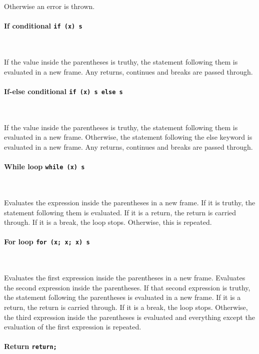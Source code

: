Otherwise an error is thrown.

\paragraph{If conditional \quad \texttt{if (x) s} } \

If the value inside the parentheses is truthy, the statement following them is evaluated in a new frame. Any returns, continues and breaks are passed through.

\paragraph{If-else conditional \quad \texttt{if (x) s else s} } \

If the value inside the parentheses is truthy, the statement following them is evaluated in a new frame. Otherwise, the statement following the else keyword is evaluated in a new frame. Any returns, continues and breaks are passed through.

\paragraph{While loop \quad \texttt{while (x) s}} \

Evaluates the expression inside the parentheses in a new frame. If it is truthy, the statement following them is evaluated. If it is a return, the return is carried through. If it is a break, the loop stops. Otherwise, this is repeated.

\paragraph{For loop \quad \texttt{for (x; x; x) s}} \

Evaluates the first expression inside the parentheses in a new frame. Evaluates the second expression inside the parentheses. If that second expression is truthy, the statement following the parentheses is evaluated in a new frame. If it is a return, the return is carried through. If it is a break, the loop stops. Otherwise, the third expression inside the parentheses is evaluated and everything except the evaluation of the first expression is repeated.

\paragraph{Return \quad \texttt{return;}} \

